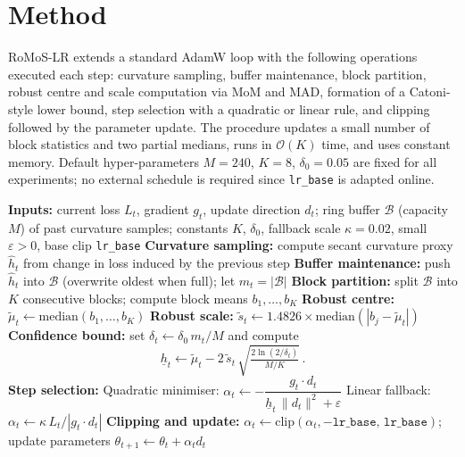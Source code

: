 \documentclass{article} %
\begin{document}
\section{Method}\label{sec:method}
RoMoS-LR extends a standard AdamW loop with the following operations executed each step: curvature sampling, buffer maintenance, block partition, robust centre and scale computation via MoM and MAD, formation of a Catoni-style lower bound, step selection with a quadratic or linear rule, and clipping followed by the parameter update. The procedure updates a small number of block statistics and two partial medians, runs in \(\mathcal{O}(K)\) time, and uses constant memory. Default hyper-parameters \(M = 240\), \(K = 8\), \(\delta_{0} = 0.05\) are fixed for all experiments; no external schedule is required since \texttt{lr\_base} is adapted online.

\begin{algorithm}[H]
\caption{RoMoS-LR: per-step robust secant learning-rate selection}
\begin{algorithmic}[1]
\State \textbf{Inputs:} current loss \(L_t\), gradient \(g_t\), update direction \(d_t\); ring buffer \(\mathcal{B}\) (capacity \(M\)) of past curvature samples; constants \(K\), \(\delta_{0}\), fallback scale \(\kappa = 0.02\), small \(\varepsilon > 0\), base clip \texttt{lr\_base}
\State \textbf{Curvature sampling:} compute secant curvature proxy \(\hat{h}_t\) from change in loss induced by the previous step
\State \textbf{Buffer maintenance:} push \(\hat{h}_t\) into \(\mathcal{B}\) (overwrite oldest when full); let \(m_t = |\mathcal{B}|\)
\State \textbf{Block partition:} split \(\mathcal{B}\) into \(K\) consecutive blocks; compute block means \(b_1,\dots,b_K\)
\State \textbf{Robust centre:} \(\tilde{\mu}_t \leftarrow \mathrm{median}(b_1,\dots,b_K)\)
\State \textbf{Robust scale:} \(\tilde{s}_t \leftarrow 1.4826 \times \mathrm{median}(|b_j - \tilde{\mu}_t|)\)
\State \textbf{Confidence bound:} set \(\delta_t \leftarrow \delta_{0}\, m_t / M\) and compute
\[
\underline{h}_t \leftarrow \tilde{\mu}_t - 2\,\tilde{s}_t\, \sqrt{\tfrac{2\ln(2/\delta_t)}{M/K}}\, .
\]
\State \textbf{Step selection:}
  \State Quadratic minimiser: \(\alpha_t \leftarrow -\dfrac{g_t \cdot d_t}{\underline{h}_t\, \lVert d_t \rVert^{2} + \varepsilon}\)
\Else
  \State Linear fallback: \(\alpha_t \leftarrow \kappa\, L_t / |g_t \cdot d_t|\)
\EndIf
\State \textbf{Clipping and update:} \(\alpha_t \leftarrow \mathrm{clip}(\alpha_t, -\texttt{lr\_base},\, \texttt{lr\_base})\); update parameters \(\theta_{t+1} \leftarrow \theta_t + \alpha_t d_t\)
\end{algorithmic}
\end{algorithm}
\end{document}

